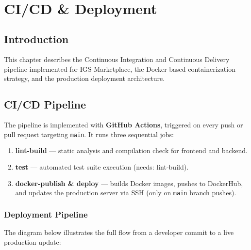 ﻿﻿%
\chapter{CI/CD \& Deployment}
\chaptersommaire
\clearpage

\section*{Introduction}
This chapter describes the Continuous Integration and Continuous Delivery pipeline implemented for IGS Marketplace, the Docker-based containerization strategy, and the production deployment architecture.

\section{CI/CD Pipeline}

The pipeline is implemented with \textbf{GitHub Actions}, triggered on every push or pull request targeting \texttt{main}. It runs three sequential jobs:

\begin{enumerate}
  \item \textbf{lint-build} — static analysis and compilation check for frontend and backend.
  \item \textbf{test} — automated test suite execution (needs: lint-build).
  \item \textbf{docker-publish \& deploy} — builds Docker images, pushes to DockerHub, and updates the production server via SSH (only on \texttt{main} branch pushes).
\end{enumerate}

\subsection{Deployment Pipeline}

The diagram below illustrates the full flow from a developer commit to a live production update:

